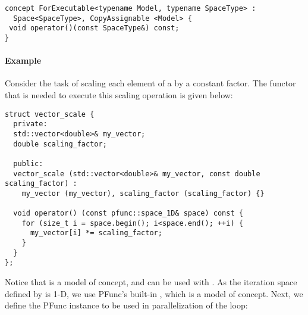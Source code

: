 \begin{center}
\begin{minipage}{0.6\textwidth}
\begin{lstlisting}
concept ForExecutable<typename Model, typename SpaceType> : 
  Space<SpaceType>, CopyAssignable <Model> {
 void operator()(const SpaceType&) const;
}
\end{lstlisting}
\end{minipage}
\end{center}

\paragraph{Example} Consider the task of scaling each element of a 
 by a constant factor.
%
The functor that is needed to execute this scaling operation is given below:
%
\begin{center}
\begin{minipage}{0.8\textwidth}
\begin{lstlisting}
struct vector_scale {
  private:
  std::vector<double>& my_vector;
  double scaling_factor;

  public:
  vector_scale (std::vector<double>& my_vector, const double scaling_factor) :
    my_vector (my_vector), scaling_factor (scaling_factor) {}

  void operator() (const pfunc::space_1D& space) const {
    for (size_t i = space.begin(); i<space.end(); ++i) {
      my_vector[i] *= scaling_factor;
    }
  }
};
\end{lstlisting}
\end{minipage}
\end{center}
%
Notice that  is a model of  concept,
and can be used with .
%
As the iteration space defined by  is 1-D, we use PFunc's 
built-in , which is a model of  concept.
%
Next, we define the PFunc instance to be used in parallelization of the
 loop:

